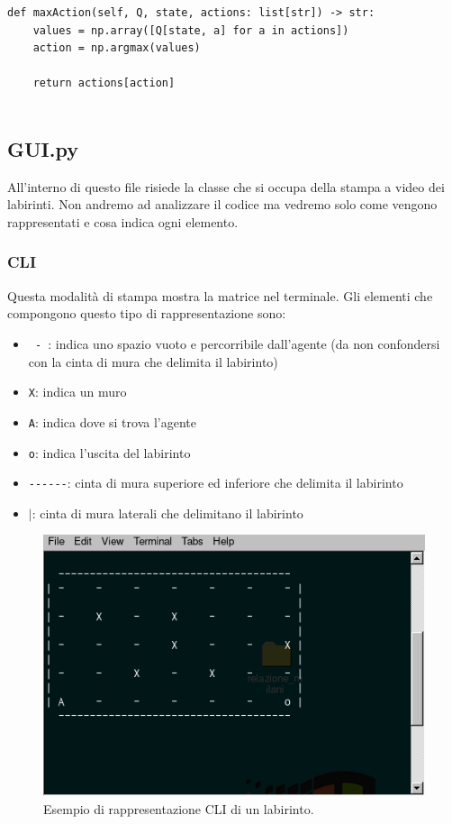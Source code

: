 \begin{lstlisting}[style=python, caption={Codice del metodo maxAction}]
def maxAction(self, Q, state, actions: list[str]) -> str:
	values = np.array([Q[state, a] for a in actions])
	action = np.argmax(values)

	return actions[action]
	
\end{lstlisting}

\subsection{GUI.py}

All'interno di questo file risiede la classe che si occupa della stampa a video dei labirinti. Non andremo ad analizzare il codice ma vedremo solo come vengono rappresentati e cosa indica ogni elemento.

\subsubsection{CLI}

Questa modalit\`{a} di stampa mostra la matrice nel terminale. Gli elementi che compongono questo tipo di rappresentazione sono:

\begin{itemize}
	\item \lstinline[style=cmd]| - |: indica uno spazio vuoto e percorribile dall'agente (da non confondersi con la cinta di mura che delimita il labirinto)
	\item \lstinline[style=cmd]|X|: indica un muro
	\item \lstinline[style=cmd]|A|: indica dove si trova l'agente
	\item \lstinline[style=cmd]|o|: indica l'uscita del labirinto
	\item \lstinline[style=cmd]|------|: cinta di mura superiore ed inferiore che delimita il labirinto
	\item $|$: cinta di mura laterali che delimitano il labirinto
\end{itemize}

\begin{figure}[H]
	\centering
	\includegraphics[width=.5\textwidth]{img/maze_cli.png}
	\caption{Esempio di rappresentazione CLI di un labirinto.}
\end{figure}

